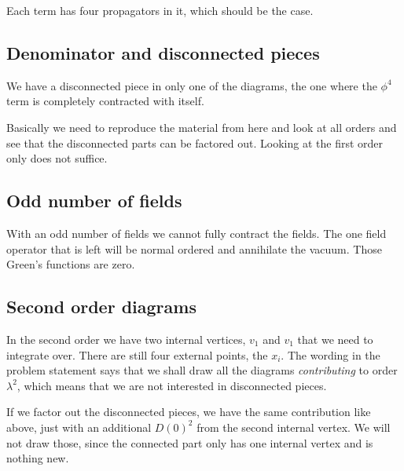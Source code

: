 \documentclass[11pt, english, fleqn, DIV=15, headinclude, BCOR=1cm]{scrartcl}
\begin{document}
Each term has four propagators in it, which should be the case.

\subsection{Denominator and disconnected pieces}

We have a disconnected piece in only one of the diagrams, the one where the
$\phi^4$ term is completely contracted with itself.

Basically we need to reproduce the material from
\textcite[96-98]{Peskin/QFT/1995} here and look at all orders and see that the
disconnected parts can be factored out. Looking at the first order only does
not suffice.


\subsection{Odd number of fields}

With an odd number of fields we cannot fully contract the fields. The one field
operator that is left will be normal ordered and annihilate the vacuum. Those
Green's functions are zero.

\subsection{Second order diagrams}

In the second order we have two internal vertices, $v_1$ and $v_1$ that we need
to integrate over. There are still four external points, the $x_i$. The wording
in the problem statement says that we shall draw all the diagrams
\emph{contributing} to order $\lambda^2$, which means that we are not
interested in disconnected pieces.

If we factor out the disconnected pieces, we have the same contribution like
above, just with an additional $D(0)^2$ from the second internal vertex. We
will not draw those, since the connected part only has one internal vertex and
is nothing new.
\end{document}
